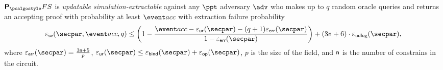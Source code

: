 \begin{corollary}
\label{thm:plonkprotfs_se}
$\plonkprotfs$ is \emph{updatable simulation-extractable} against any $\ppt$ adversary $\advse$ who makes up to $q$ random oracle queries and returns an accepting proof with probability at least $\accProb$ with extraction failure probability 
\[
  \epsse(\secpar, \accProb, q) \leq \left(1 - \frac{\accProb - \epsur (\secpar) - (q + 1) \epserr (\secpar)} {1 - \epserr (\secpar)}\right) + (3 \noofc + 6) \cdot \epsudlog (\secpar)\COMMENT{ + (3 \noofc + 6) \cdot \epsid (\secpar)},
\]
where $\epserr (\secpar) = \frac{3 \noofc + 5}{p}$, $\epsur (\secpar) \leq \epsbind (\secpar) + \epsop (\secpar)$, $p$ is the size of the field, and $\mathsf{n}$ is the number of constrains in the circuit. 
\end{corollary}
 
